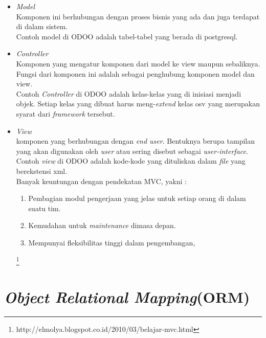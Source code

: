 \begin{itemize}
	\item \textit{Model}\\
	Komponen ini berhubungan dengan proses bisnis yang ada dan juga terdapat di dalam sistem.\\
	Contoh model di ODOO adalah tabel-tabel yang berada di postgresql.
	\item \textit{Controller}\\
	Komponen yang mengatur komponen dari model ke view maupun sebaliknya. Fungsi dari komponen ini adalah sebagai penghubung komponen model dan view.\\
	Contoh \textit{Controller} di ODOO adalah kelas-kelas yang di inisiasi menjadi objek. Setiap kelas yang dibuat harus meng-\textit{extend} kelas osv yang merupakan syarat dari \textit{framework} tersebut.
	\item \textit{View}\\
	komponen yang berhubungan dengan \textit{end user}. Bentuknya berupa tampilan yang akan digunakan oleh \textit{user} atau sering disebut sebagai \textit{user-interface}.
	Contoh \textit{view} di ODOO adalah kode-kode yang dituliskan dalam \textit{file} yang berekstensi xml.\\
	Banyak keuntungan dengan pendekatan MVC, yakni \cite{Hans:2014}:
	\begin{enumerate}
		\item Pembagian modul pengerjaan yang jelas untuk setiap orang di dalam suatu tim.
		\item Kemudahan untuk \textit{maintenance} dimasa depan.
		\item Mempunyai fleksibilitas tinggi dalam pengembangan,
	\end{enumerate}
\footnote{http://elmolya.blogspot.co.id/2010/03/belajar-mvc.html}
	
	
	
\end{itemize}
\section{\textit{Object Relational Mapping}(ORM)}
	
